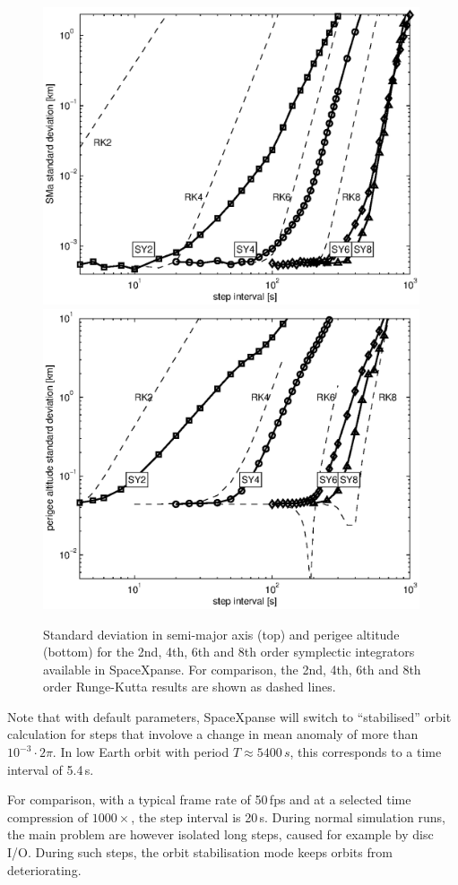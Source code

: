 \documentclass[a4paper]{article}
\begin{document}
\begin{figure}\centering
\includegraphics[width=0.99\textwidth]{sma_symp_std}
\includegraphics[width=0.99\textwidth]{pea_symp_std}
\caption{Standard deviation in semi-major axis (top) and perigee altitude (bottom) for the 2nd, 4th, 6th and 8th order symplectic integrators available in SpaceXpanse. For comparison, the 2nd, 4th, 6th and 8th order Runge-Kutta results are shown as dashed lines.}
\label{fig:symp_err}
\end{figure}

Note that with default parameters, SpaceXpanse will switch to ``stabilised'' orbit calculation for steps that involove a change in mean anomaly of more than $10^{-3} \cdot 2\pi$. In low Earth orbit with period $T\approx5400\,s$, this corresponds to a time interval of 5.4\,s.

For comparison, with a typical frame rate of 50\,fps and at a selected time compression of $1000\times$, the step interval is 20\,s. During normal simulation runs, the main problem are however isolated long steps, caused for example by disc I/O. During such steps, the orbit stabilisation mode keeps orbits from deteriorating. 


\end{document}
